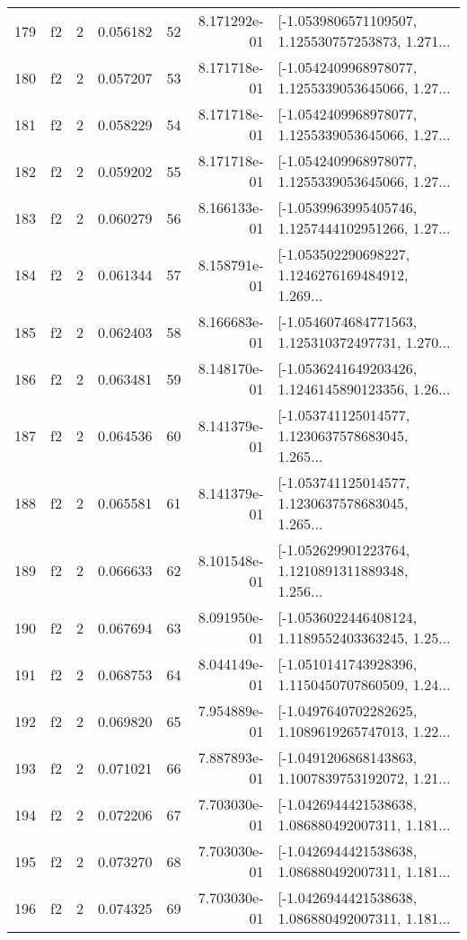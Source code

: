 \begin{tabular}{lllrlrl}
179 &  f2 &   2 &  0.056182 &   52 &  8.171292e-01 &  [-1.0539806571109507, 1.125530757253873, 1.271... \\
180 &  f2 &   2 &  0.057207 &   53 &  8.171718e-01 &  [-1.0542409968978077, 1.1255339053645066, 1.27... \\
181 &  f2 &   2 &  0.058229 &   54 &  8.171718e-01 &  [-1.0542409968978077, 1.1255339053645066, 1.27... \\
182 &  f2 &   2 &  0.059202 &   55 &  8.171718e-01 &  [-1.0542409968978077, 1.1255339053645066, 1.27... \\
183 &  f2 &   2 &  0.060279 &   56 &  8.166133e-01 &  [-1.0539963995405746, 1.1257444102951266, 1.27... \\
184 &  f2 &   2 &  0.061344 &   57 &  8.158791e-01 &  [-1.053502290698227, 1.1246276169484912, 1.269... \\
185 &  f2 &   2 &  0.062403 &   58 &  8.166683e-01 &  [-1.0546074684771563, 1.125310372497731, 1.270... \\
186 &  f2 &   2 &  0.063481 &   59 &  8.148170e-01 &  [-1.0536241649203426, 1.1246145890123356, 1.26... \\
187 &  f2 &   2 &  0.064536 &   60 &  8.141379e-01 &  [-1.053741125014577, 1.1230637578683045, 1.265... \\
188 &  f2 &   2 &  0.065581 &   61 &  8.141379e-01 &  [-1.053741125014577, 1.1230637578683045, 1.265... \\
189 &  f2 &   2 &  0.066633 &   62 &  8.101548e-01 &  [-1.052629901223764, 1.1210891311889348, 1.256... \\
190 &  f2 &   2 &  0.067694 &   63 &  8.091950e-01 &  [-1.0536022446408124, 1.1189552403363245, 1.25... \\
191 &  f2 &   2 &  0.068753 &   64 &  8.044149e-01 &  [-1.0510141743928396, 1.1150450707860509, 1.24... \\
192 &  f2 &   2 &  0.069820 &   65 &  7.954889e-01 &  [-1.0497640702282625, 1.1089619265747013, 1.22... \\
193 &  f2 &   2 &  0.071021 &   66 &  7.887893e-01 &  [-1.0491206868143863, 1.1007839753192072, 1.21... \\
194 &  f2 &   2 &  0.072206 &   67 &  7.703030e-01 &  [-1.0426944421538638, 1.086880492007311, 1.181... \\
195 &  f2 &   2 &  0.073270 &   68 &  7.703030e-01 &  [-1.0426944421538638, 1.086880492007311, 1.181... \\
196 &  f2 &   2 &  0.074325 &   69 &  7.703030e-01 &  [-1.0426944421538638, 1.086880492007311, 1.181... \\

\end{tabular}
